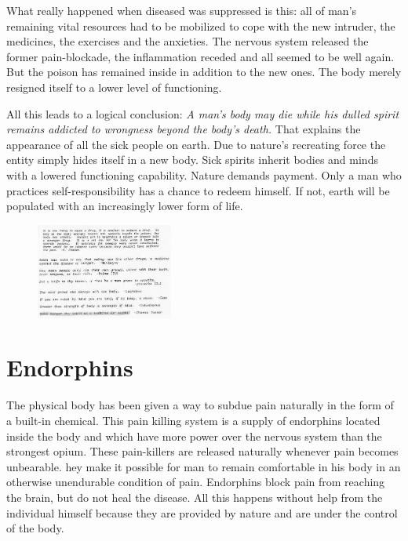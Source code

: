 \documentclass[landscape,twocolumn,letterpaper]{article}
\begin{document}
What really happened when diseased was suppressed is this: all of
man's remaining vital resources had to be mobilized to cope with the
new intruder, the medicines, the exercises and the anxieties. The
nervous system released the former pain-blockade, the inflammation
receded and all seemed to be well again. But the poison has remained
inside in addition to the new ones. The body merely resigned itself to
a lower level of functioning.

All this leads to a logical conclusion: \emph{A man's body may die
while his dulled spirit remains addicted to wrongness beyond the
body's death.} That explains the appearance of all the sick people on
earth. Due to nature's recreating force the entity simply hides itself
in a new body. Sick spirits inherit bodies and minds with a lowered
functioning capability. Nature demands payment. Only a man who
practices self-responsibility has a chance to redeem himself. If not,
earth will be populated with an increasingly lower form of life.

\begin{figure} \centering
  \includegraphics[width=0.4\textwidth,bb= 0 0 449 315]{p22quotes.jpg}
\end{figure}


\section{Endorphins}
\label{sec:endo}


The physical body has been given a way to subdue pain naturally in the
form of a built-in chemical. This pain killing system is a supply of
endorphins located inside the body and which have more power over the
nervous system than the strongest opium. These pain-killers are
released naturally whenever pain becomes unbearable. hey make it
possible for man to remain comfortable in his body in an otherwise
unendurable condition of pain. Endorphins block pain from reaching the
brain, but do not heal the disease. All this happens without help from
the individual himself because they are provided by nature and are
under the control of the body.
\end{document}
